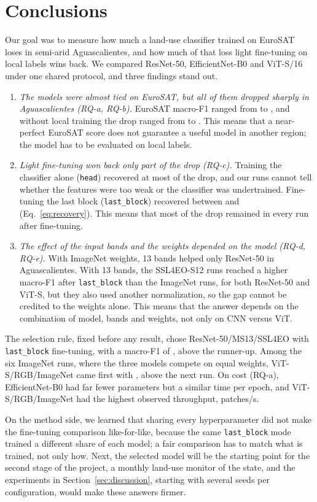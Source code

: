 \section{Conclusions}\label{sec:conclusions}

Our goal was to measure how much a land-use classifier trained on EuroSAT loses in semi-arid
Aguascalientes, and how much of that loss light fine-tuning on local labels wins back. We
compared ResNet-50, EfficientNet-B0 and ViT-S/16 under one shared protocol, and three findings
stand out.

\begin{enumerate}
  \item \emph{The models were almost tied on EuroSAT, but all of them dropped sharply in
  Aguascalientes (RQ-a, RQ-b).} EuroSAT macro-F1 ranged from \EuroSATMin{} to \EuroSATMax, and
  without local training the drop ranged from \DropMin{} to \DropMax. This means that a
  near-perfect EuroSAT score does not guarantee a useful model in another region; the model has
  to be evaluated on local labels.
  \item \emph{Light fine-tuning won back only part of the drop (RQ-c).} Training the classifier
  alone (\texttt{head}) recovered at most \HeadRecoveryMax{} of the drop, and our runs cannot
  tell whether the features were too weak or the classifier was undertrained. Fine-tuning the
  last block (\texttt{last\_block}) recovered between \RecoveryMin{} and \RecoveryMax{}
  (Eq.~\ref{eq:recovery}). This means that most of the drop remained in every run after
  fine-tuning.
  \item \emph{The effect of the input bands and the weights depended on the model (RQ-d,
  RQ-e).} With ImageNet weights, 13 bands helped only ResNet-50 in Aguascalientes. With 13
  bands, the SSL4EO-S12 runs reached a higher macro-F1 after \texttt{last\_block} than the
  ImageNet runs, for both ResNet-50 and ViT-S, but they also used another normalization, so the
  gap cannot be credited to the weights alone. This means that the answer depends on the
  combination of model, bands and weights, not only on CNN versus ViT.
\end{enumerate}

The selection rule, fixed before any result, chose ResNet-50/MS13/SSL4EO with
\texttt{last\_block} fine-tuning, with a macro-F1 of \AgsLastBlockBest, \SelectionMargin{} above
the runner-up. Among the six ImageNet runs, where the three models compete on equal weights,
ViT-S/RGB/ImageNet came first with \ImageNetLastBlockBest, \ImageNetSelectionMargin{} above the
next run. On cost (RQ-a), EfficientNet-B0 had far fewer parameters but a similar time per epoch,
and ViT-S/RGB/ImageNet had the highest observed throughput, \PatchesPerSecMax{} patches/s.

On the method side, we learned that sharing every hyperparameter did not make the fine-tuning
comparison like-for-like, because the same \texttt{last\_block} mode trained a different share
of each model; a fair comparison has to match what is trained, not only how. Next, the selected
model will be the starting point for the second stage of the project, a monthly land-use monitor
of the state, and the experiments in Section~\ref{sec:discussion}, starting with several seeds
per configuration, would make these answers firmer.
